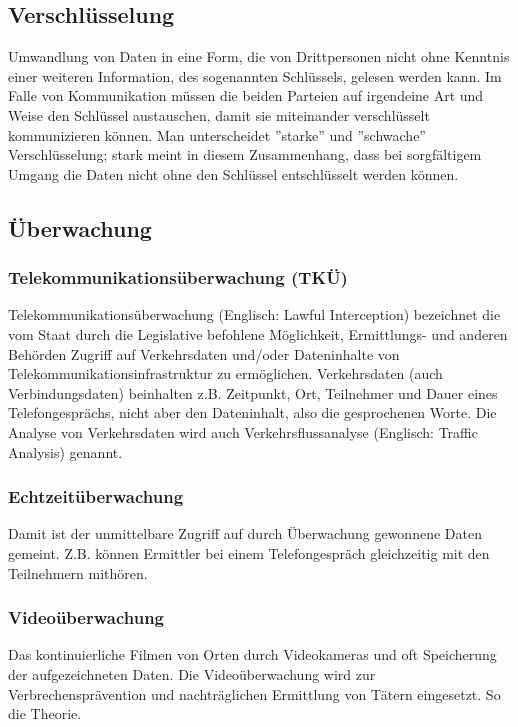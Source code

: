 	\subsection{Verschlüsselung}
	  Umwandlung von Daten in eine Form, die von Drittpersonen nicht ohne 
	  Kenntnis einer weiteren Information, des sogenannten Schlüssels, 
	  gelesen werden kann. Im Falle von Kommunikation müssen die beiden 
	  Parteien auf irgendeine Art und Weise den Schlüssel austauschen, damit 
	  sie miteinander verschlüsselt kommunizieren können. Man 
	  unterscheidet ''starke'' und ''schwache'' Verschlüsselung; stark meint in 
	  diesem Zusammenhang, dass bei sorgfältigem Umgang die Daten nicht ohne 
	  den Schlüssel entschlüsselt werden können. 
	
	\subsection{Überwachung}
	  \subsubsection{Telekommunikationsüberwachung (TKÜ)}
	    Telekommunikationsüberwachung (Englisch: Lawful Interception) 
	    bezeichnet die vom Staat durch die Legislative befohlene Möglichkeit, 
	    Ermittlungs- und anderen Behörden Zugriff auf Verkehrsdaten und/oder 
	    Dateninhalte von Telekommunikationsinfrastruktur zu ermöglichen. 
	    Verkehrsdaten (auch Verbindungsdaten) beinhalten z.B. Zeitpunkt, Ort, 
	    Teilnehmer und Dauer eines Telefongesprächs, nicht aber den 
	    Dateninhalt, also die gesprochenen Worte. Die Analyse von Verkehrsdaten 
	    wird auch Verkehrsflussanalyse (Englisch: Traffic Analysis) genannt. 
	
	  \subsubsection{Echtzeitüberwachung }
	    Damit ist der unmittelbare Zugriff auf durch Überwachung gewonnene 
	    Daten gemeint. Z.B. können Ermittler bei einem Telefongespräch 
	    gleichzeitig mit den Teilnehmern mithören. 
	  
	  \subsubsection{Videoüberwachung}
	    Das kontinuierliche Filmen von Orten durch Videokameras und oft 
	    Speicherung der aufgezeichneten Daten. Die Videoüberwachung wird zur 
	    Verbrechensprävention und nachträglichen Ermittlung von Tätern 
	    eingesetzt. So die Theorie. 
	  
